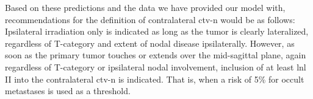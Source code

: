 \documentclass[\relativeRoot/main.tex]{subfiles}
\begin{document}
Based on these predictions and the data we have provided our model with, recommendations for the definition of contralateral \gls{ctv-n} would be as follows: Ipsilateral irradiation only is indicated as long as the tumor is clearly lateralized, regardless of T-category and extent of nodal disease ipsilaterally. However, as soon as the primary tumor touches or extends over the mid-sagittal plane, again regardless of T-category or ipsilateral nodal involvement, inclusion of at least \gls{lnl} II into the contralateral \gls{ctv-n} is indicated. That is, when a risk of 5\% for occult metastases is used as a threshold.
\end{document}
